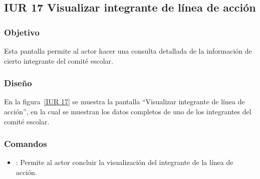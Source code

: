 \subsection{IUR 17 Visualizar integrante de línea de acción}

\subsubsection{Objetivo}

Esta pantalla permite al  actor  hacer una consulta detallada de la información de cierto integrante del comité escolar.

\subsubsection{Diseño}


	En la figura~\ref{IUR 17} se muestra la pantalla ``Visualizar integrante de línea de acción'', en la cual se muestran los datos completos de uno de los integrantes del comité escolar. 
	

	

	
	
\subsubsection{Comandos}
    \begin{itemize}
	
	\item {}: Permite al actor concluir la visualización del integrante de la línea de acción. 
    \end{itemize}

